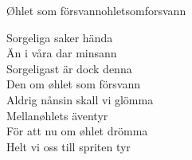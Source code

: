 \begin{song}{Øhlet som försvann}{ohletsomforsvann}
\begin{vers}
Sorgeliga saker hända\\
Än i våra dar minsann\\
Sorgeligast är dock denna\\
Den om øhlet som försvann\\
Aldrig nånsin skall vi glömma\\
Mellanøhlets äventyr\\
För att nu om øhlet drömma\\
Helt vi oss till spriten tyr\\
\end{vers}
\end{song}
